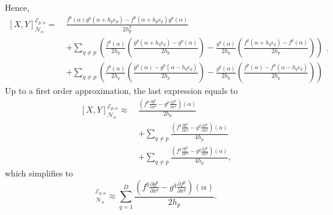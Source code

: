 \begin{discussion}
  Hence,
  \begin{equation}
    \begin{split}
        [X, Y]^{\mathcal{E}_{p, \alpha}}_{\mathcal{N}_{\alpha}} = \
      & \frac
        {f^p(\alpha) g^p(\alpha + h_p e_p) - f^p(\alpha + h_p e_p) g^p(\alpha)}
        {2 h_p^2} \\
      & +
        \sum_{q \neq p}
          \left(
            \frac{f^q(\alpha)}{2 h_q}
            \left(\frac{g^p(\alpha + h_q e_q) - g^p(\alpha)}{2 h_p}\right)
            -
            \frac{g^q(\alpha)}{2 h_q}
            \left(\frac{f^p(\alpha + h_q e_q) - f^p(\alpha)}{2 h_p}\right)
          \right) \\
      & +
        \sum_{q \neq p}
          \left(
            \frac{f^q(\alpha)}{2 h_q}
            \left(\frac{g^p(\alpha) - g^p(\alpha - h_q e_q)}{2 h_p}\right)
            -
            \frac{g^q(\alpha)}{2 h_q}
            \left(\frac{f^p(\alpha) - f^p(\alpha - h_q e_q)}{2 h_p}\right)
          \right)
    \end{split}.
  \end{equation}
  Up to a first order approximation, the last expression equals to
  \begin{equation}
    \begin{split}
        [X, Y]^{\mathcal{E}_{p, \alpha}}_{\mathcal{N}_{\alpha}} \approx \
      & \frac
        {\left(f^p \frac{\partial g^p}{\partial x^p}
         - g^p \frac{\partial f^p}{\partial x^p}\right)(\alpha)}
        {2 h_p} \\
      & +
        \sum_{q \neq p}
          \frac
          {
            \left(
              f^q \frac{\partial g^p}{\partial x^q}
              - g^q \frac{\partial f^p}{\partial x^q}
            \right)
            (\alpha)
          }
          {4 h_p} \\
      & +
        \sum_{q \neq p}
          \frac
          {
            \left(
              f^q \frac{\partial g^p}{\partial x^q}
              - g^q \frac{\partial f^p}{\partial x^q}
            \right)
            (\alpha)
          }
          {4 h_p},
    \end{split}
  \end{equation}
  which simplifies to
  \begin{equation}
    [X, Y]^{\mathcal{E}_{p, \alpha}}_{\mathcal{N}_{\alpha}}
    \approx
    \sum_{q = 1}^D
      \frac
      {
        \left(
          f^q \frac{\partial g^p}{\partial x^q}
          - g^q \frac{\partial f^p}{\partial x^q}
        \right)
        (\alpha)
      }
      {2 h_p}.

\end{equation}
\end{discussion}
